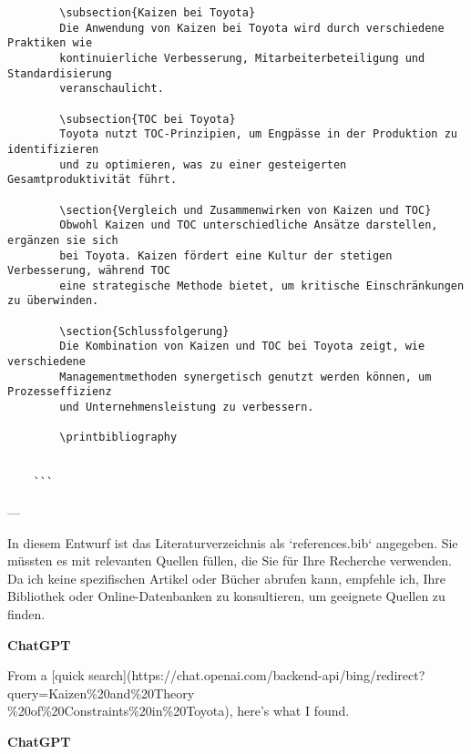 \begin{verbatim}
		\subsection{Kaizen bei Toyota}
		Die Anwendung von Kaizen bei Toyota wird durch verschiedene Praktiken wie 
		kontinuierliche Verbesserung, Mitarbeiterbeteiligung und Standardisierung 
		veranschaulicht.
		
		\subsection{TOC bei Toyota}
		Toyota nutzt TOC-Prinzipien, um Engpässe in der Produktion zu identifizieren
		und zu optimieren, was zu einer gesteigerten Gesamtproduktivität führt.
		
		\section{Vergleich und Zusammenwirken von Kaizen und TOC}
		Obwohl Kaizen und TOC unterschiedliche Ansätze darstellen, ergänzen sie sich
		bei Toyota. Kaizen fördert eine Kultur der stetigen Verbesserung, während TOC
		eine strategische Methode bietet, um kritische Einschränkungen zu überwinden.
		
		\section{Schlussfolgerung}
		Die Kombination von Kaizen und TOC bei Toyota zeigt, wie verschiedene
		Managementmethoden synergetisch genutzt werden können, um Prozesseffizienz
		und Unternehmensleistung zu verbessern.
		
		\printbibliography
		
	
	```
\end{verbatim}
---

In diesem Entwurf ist das Literaturverzeichnis als `references.bib` angegeben. Sie müssten es mit relevanten Quellen füllen, die Sie für Ihre Recherche verwenden. Da ich keine spezifischen Artikel oder Bücher abrufen kann, empfehle ich, Ihre Bibliothek oder Online-Datenbanken zu konsultieren, um geeignete Quellen zu finden.

\textbf{ChatGPT}


From a [quick search](https://chat.openai.com/backend-api/bing/redirect?query=Kaizen\%20and\%20Theory \\
\%20of\%20Constraints\%20in\%20Toyota), here's what I found.

\textbf{ChatGPT}

